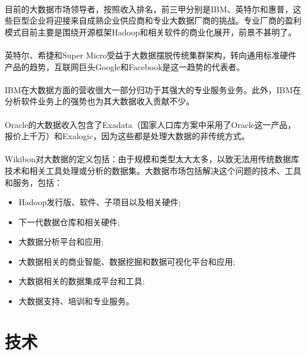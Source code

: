 \documentclass[12pt]{article}
\begin{document}
\paragraph{}
目前的大数据市场领导者，按照收入排名，前三甲分别是IBM、英特尔和惠普，这些巨型企业将迎接来自成熟企业供应商和专业大数据厂商的挑战。专业厂商的盈利模式目前主要是围绕开源框架Hadoop和相关软件的商业化展开，前景不甚明了。

\paragraph{}
英特尔、希捷和Super Micro受益于大数据摆脱传统集群架构，转向通用标准硬件产品的趋势，互联网巨头Google和Facebook是这一趋势的代表者。

\paragraph{}
IBM在大数据方面的营收很大一部分归功于其强大的专业服务业务。此外，IBM在分析软件业务上的强势也为其大数据收入贡献不少。

\paragraph{}
Oracle的大数据收入包含了Exadata（国家人口库方案中采用了Oracle这一产品，报价上千万）和Exalogic，因为这些都是处理大数据的非传统方式。

\paragraph{}
Wikibon对大数据的定义包括：由于规模和类型太大太多，以致无法用传统数据库技术和相关工具处理或分析的数据集。大数据市场包括解决这个问题的技术、工具和服务，包括：
\begin{itemize}
\item
Hadoop发行版、软件、子项目以及相关硬件;
\item
下一代数据仓库和相关硬件;
\item
大数据分析平台和应用;
\item
大数据相关的商业智能、数据挖掘和数据可视化平台和应用;
\item
大数据相关的数据集成平台和工具;
\item
大数据支持、培训和专业服务。
\end{itemize}

\newpage

\section{技术}
\end{document}
